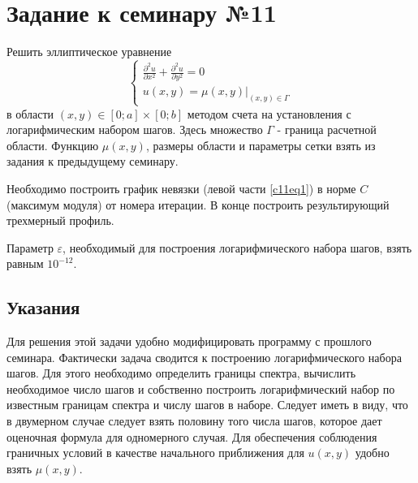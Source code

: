 \section{Задание к семинару №11}
Решить эллиптическое уравнение 
\begin{equation} \label{c11eq1}
	\begin{cases}
		\displaystyle \frac{\partial^2 u}{\partial x^2} + \frac{\partial^2 u}{\partial y^2} = 0 \\
		u(x,y) = \left. \mu(x,y) \right|_{(x,y) \in \Gamma}
	\end{cases}
\end{equation}
в области $(x,y) \in [0; a] \times [0; b]$ методом счета на установления с логарифмическим набором шагов. Здесь множество $\Gamma$ - граница расчетной области. Функцию $\mu(x,y)$, размеры области и параметры сетки взять из задания к предыдущему семинару.

Необходимо построить график невязки (левой части \eqref{c11eq1}) в норме $C$ (максимум модуля) 
от номера итерации. В конце построить результирующий трехмерный профиль.

Параметр $\varepsilon$, необходимый для построения логарифмического набора шагов, взять равным $10^{-12}$.

\subsection{Указания}
Для решения этой задачи удобно модифицировать программу с прошлого семинара. Фактически задача сводится к построению логарифмического набора шагов. Для этого необходимо определить границы спектра, вычислить необходимое число шагов и собственно построить логарифмический набор по известным границам спектра и числу шагов в наборе. Следует иметь в виду, что в двумерном случае следует взять половину того числа шагов, которое дает оценочная формула для одномерного случая. Для обеспечения соблюдения граничных условий в качестве начального приближения для $u(x,y)$ удобно взять $\mu(x,y)$.


